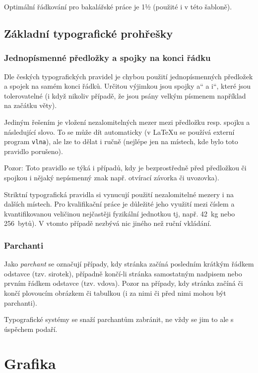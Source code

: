 \documentclass[male,czech]{kitheses}
\newcommand{\UV}[1]{\quotedblbase{}#1\textquotedblleft{}}
\begin{document}
Optimální řádkování pro bakalářské práce je 1½ (použité i v této šabloně).

\section{Základní typografické prohřešky}

\subsection{Jednopísmenné předložky a spojky na konci řádku}

Dle českých typografických pravidel je chybou použití jednopísmenných předložek a spojek na samém konci řádků. 
Určitou výjimkou jsou spojky \UV{a} a \UV{i}, které jsou tolerovatelné (i když nikoliv případě, že jsou psány velkým písmenem například na začátku věty).

Jediným řešením je vložení nezalomitelných mezer mezi předložku resp. spojku a následující slovo. To se může dít automaticky (v \LaTeX u se používá externí program \texttt{vlna}), ale lze to dělat i ručně (nejlépe jen  na místech, kde bylo toto pravidlo porušeno).

Pozor: Toto pravidlo se týká i případů, kdy je bezprostředně před předložkou či spojkou i nějaký nepísmenný
znak např. otvírací závorka či uvozovka).

Striktní typografická pravidla si vynucují použití nezalomitelné mezery i na dalších místech. Pro kvalifikační práce je důležité jeho využití mezi číslem a kvantifikovanou veličinou nejčastěji fyzikální jednotkou tj, např. 42~kg nebo 256~bytů). V vtomto případě nezbývá nic jiného než ruční vkládání.

\subsection{Parchanti}

Jako \textit{parchant} se označují případy, kdy stránka začíná posledním krátkým řádkem odstavce (tzv. sirotek), případně končí-li stránka samostatným nadpisem nebo prvním řádkem odstavce (tzv. vdova). Pozor na případy, kdy stránka začíná či končí plovoucím obrázkem či tabulkou (i za nimi či před nimi mohou být parchanti).

Typografické systémy se snaží parchantům zabránit, ne vždy se jim to ale s úspěchem podaří.

\chapter{Grafika}
\end{document}
